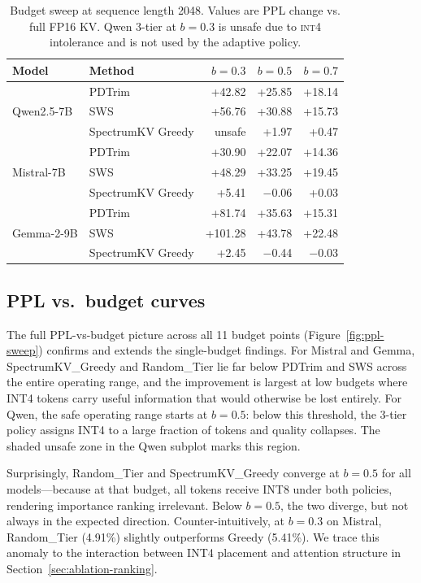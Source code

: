 \documentclass[11pt]{article}
\newcommand{\method}{SpectrumKV}
\newcommand{\budget}{b}
\newcommand{\pct}{\%}
\newcommand{\intiv}{\textsc{int4}}
\theoremstyle{plain}
\theoremstyle{definition}
\begin{document}
\begin{table}[t]
\centering
\caption{Budget sweep at sequence length 2048.  Values are PPL change vs. full FP16 KV.  Qwen 3-tier at $\budget=0.3$ is unsafe due to \intiv{} intolerance and is not used by the adaptive policy.}
\label{tab:budget}
\small
\begin{tabular}{llrrr}
\toprule
Model & Method & $\budget=0.3$ & $\budget=0.5$ & $\budget=0.7$ \\
\midrule
\multirow{3}{*}{Qwen2.5-7B}
  & PDTrim & +42.82 & +25.85 & +18.14 \\
  & SWS & +56.76 & +30.88 & +15.73 \\
  & \method{} Greedy & unsafe & +1.97 & +0.47 \\
\midrule
\multirow{3}{*}{Mistral-7B}
  & PDTrim & +30.90 & +22.07 & +14.36 \\
  & SWS & +48.29 & +33.25 & +19.45 \\
  & \method{} Greedy & +5.41 & $-$0.06 & +0.03 \\
\midrule
\multirow{3}{*}{Gemma-2-9B}
  & PDTrim & +81.74 & +35.63 & +15.31 \\
  & SWS & +101.28 & +43.78 & +22.48 \\
  & \method{} Greedy & +2.45 & $-$0.44 & $-$0.03 \\
\bottomrule
\end{tabular}
\end{table}

\subsection{PPL vs.\ budget curves}
\label{sec:ppl-curves}

The full PPL-vs-budget picture across all 11 budget points (Figure~\ref{fig:ppl-sweep}) confirms and extends the single-budget findings.  For Mistral and Gemma, \method{}\_Greedy and Random\_Tier lie far below PDTrim and SWS across the entire operating range, and the improvement is largest at low budgets where INT4 tokens carry useful information that would otherwise be lost entirely.  For Qwen, the safe operating range starts at $\budget=0.5$: below this threshold, the 3-tier policy assigns INT4 to a large fraction of tokens and quality collapses.  The shaded unsafe zone in the Qwen subplot marks this region.

Surprisingly, Random\_Tier and \method{}\_Greedy converge at $\budget=0.5$ for all models---because at that budget, all tokens receive INT8 under both policies, rendering importance ranking irrelevant.  Below $\budget=0.5$, the two diverge, but not always in the expected direction.  Counter-intuitively, at $\budget=0.3$ on Mistral, Random\_Tier (4.91\pct{}) slightly outperforms Greedy (5.41\pct{}).  We trace this anomaly to the interaction between INT4 placement and attention structure in Section~\ref{sec:ablation-ranking}.
\end{document}
